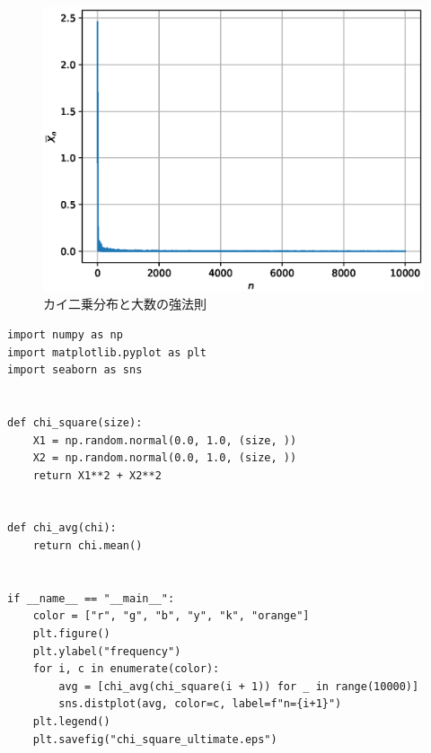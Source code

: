 \documentclass[10pt,a4paper]{ltjsarticle}       %
\begin{document}
\begin{figure}[htbp]
\begin{center}
\includegraphics[clip, scale=0.7]{chi_square_strong_row.eps}
\caption{カイ二乗分布と大数の強法則}
\end{center}
\end{figure}
\clearpage
\begin{lstlisting}
import numpy as np
import matplotlib.pyplot as plt
import seaborn as sns


def chi_square(size):
    X1 = np.random.normal(0.0, 1.0, (size, ))
    X2 = np.random.normal(0.0, 1.0, (size, ))
    return X1**2 + X2**2


def chi_avg(chi):
    return chi.mean()


if __name__ == "__main__":
    color = ["r", "g", "b", "y", "k", "orange"]
    plt.figure()
    plt.ylabel("frequency")
    for i, c in enumerate(color):
        avg = [chi_avg(chi_square(i + 1)) for _ in range(10000)]
        sns.distplot(avg, color=c, label=f"n={i+1}")
    plt.legend()
    plt.savefig("chi_square_ultimate.eps")

\end{lstlisting}
\end{document}
